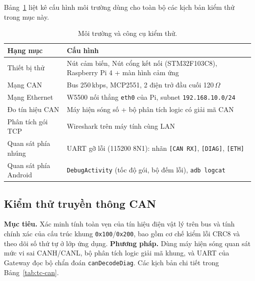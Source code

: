 \documentclass[../DoAn.tex]{subfiles}
\begin{document}
Bảng~\ref{tab:test-env} liệt kê cấu hình môi trường dùng cho toàn bộ các kịch
bản kiểm thử trong mục này.

\begin{table}[H]
  \centering
  \caption{Môi trường và công cụ kiểm thử.}
  \label{tab:test-env}
  \begin{tabular}{@{}p{3.4cm}p{8.6cm}@{}}
    \toprule
    \textbf{Hạng mục} & \textbf{Cấu hình} \\
    \midrule
    Thiết bị thử & Nút cảm biến, Nút cổng kết nối (STM32F103C8), Raspberry Pi 4 + màn hình cảm ứng \\
    Mạng CAN & Bus 250\,kbps, MCP2551, 2 điện trở đầu cuối 120\,$\Omega$ \\
    Mạng Ethernet & W5500 nối thẳng \texttt{eth0} của Pi, subnet \texttt{192.168.10.0/24} \\
    Đo tín hiệu CAN & Máy hiện sóng số + bộ phân tích logic có giải mã CAN \\
    Phân tích gói TCP & Wireshark trên máy tính cùng LAN \\
    Quan sát phía nhúng & UART gỡ lỗi (115200 8N1): nhãn \texttt{[CAN RX]}, \texttt{[DIAG]}, \texttt{[ETH]} \\
    Quan sát phía Android & \texttt{DebugActivity} (tốc độ gói, bộ đếm lỗi), \texttt{adb logcat} \\
    \bottomrule
  \end{tabular}
\end{table}

\subsection{Kiểm thử truyền thông CAN}
\label{section:4.4.1}

\textbf{Mục tiêu.} Xác minh tính toàn vẹn của tín hiệu điện vật lý trên bus và
tính chính xác của cấu trúc khung \texttt{0x100}/\texttt{0x200}, bao gồm cơ chế
kiểm lỗi CRC8 và theo dõi số thứ tự ở lớp ứng dụng. \textbf{Phương pháp.} Dùng
máy hiện sóng quan sát mức vi sai CANH/CANL, bộ phân tích logic giải mã khung,
và UART của Gateway đọc bộ chẩn đoán \texttt{canDecodeDiag}. Các kịch bản chi
tiết trong Bảng~\ref{tab:tc-can}.
\end{document}
